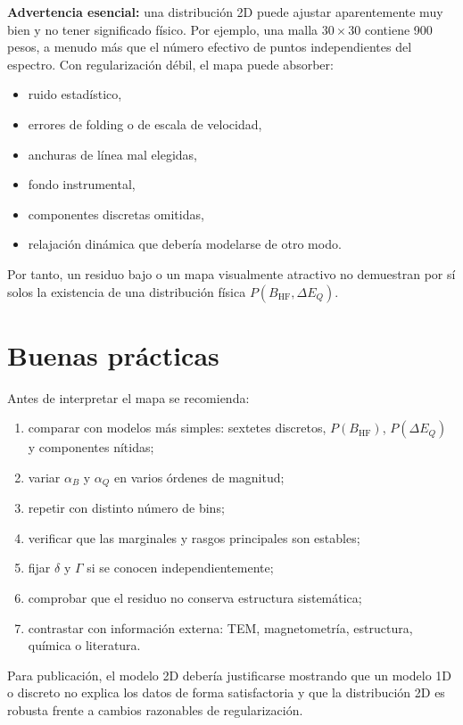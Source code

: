 \documentclass[11pt,a4paper]{article}
\newcommand{\BHF}{B_{\mathrm{HF}}}
\newcommand{\DEQ}{\Delta E_Q}
\begin{document}
\textbf{Advertencia esencial:} una distribución 2D puede ajustar aparentemente
muy bien y no tener significado físico. Por ejemplo, una malla $30\times30$
contiene 900 pesos, a menudo más que el número efectivo de puntos independientes
del espectro. Con regularización débil, el mapa puede absorber:
\begin{itemize}
  \item ruido estadístico,
  \item errores de folding o de escala de velocidad,
  \item anchuras de línea mal elegidas,
  \item fondo instrumental,
  \item componentes discretas omitidas,
  \item relajación dinámica que debería modelarse de otro modo.
\end{itemize}
Por tanto, un residuo bajo o un mapa visualmente atractivo no demuestran por sí
solos la existencia de una distribución física $P(\BHF,\DEQ)$.

\section{Buenas prácticas}

Antes de interpretar el mapa se recomienda:
\begin{enumerate}
  \item comparar con modelos más simples: sextetes discretos, $P(\BHF)$,
  $P(\DEQ)$ y componentes nítidas;
  \item variar $\alpha_B$ y $\alpha_Q$ en varios órdenes de magnitud;
  \item repetir con distinto número de bins;
  \item verificar que las marginales y rasgos principales son estables;
  \item fijar $\delta$ y $\Gamma$ si se conocen independientemente;
  \item comprobar que el residuo no conserva estructura sistemática;
  \item contrastar con información externa: TEM, magnetometría, estructura,
  química o literatura.
\end{enumerate}
Para publicación, el modelo 2D debería justificarse mostrando que un modelo 1D o
discreto no explica los datos de forma satisfactoria y que la distribución 2D es
robusta frente a cambios razonables de regularización.
\end{document}
